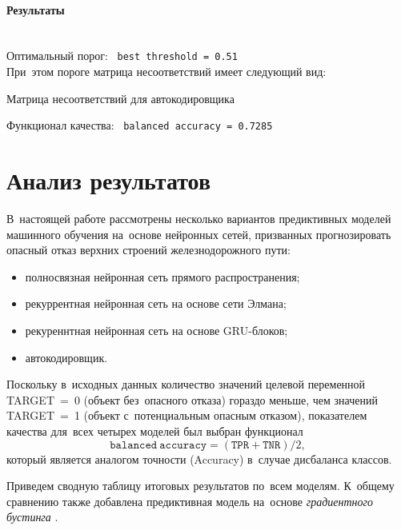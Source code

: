 \vspace{-2.5ex}
\paragraph{Результаты}~\\
Оптимальный порог: \ \texttt{best\ threshold = 0.51}\\
При~этом пороге матрица несоответствий имеет следующий вид:

\begin{table}[!h]
	\centering
	\caption{Матрица несоответствий для автокодировщика}\medskip
	
	\label{AE_conf_mtrx}
\end{table}

\noindent
Функционал качества: \ \texttt{balanced\ accuracy = 0.7285}

\clearpage
\section{Анализ результатов}\label{results}

В~настоящей работе рассмотрены несколько вариантов предиктивных моделей машинного обучения
на~основе нейронных сетей, призванных прогнозировать опасный отказ верхних строений железнодорожного пути:

\begin{itemize}[noitemsep, wide]
	\item полносвязная нейронная сеть прямого распространения;
	\item рекуррентная нейронная сеть на основе сети Элмана;
	\item рекуреннтная нейронная сеть на основе GRU-блоков;
	\item автокодировщик.
\end{itemize}

Поскольку в~исходных данных количество значений целевой переменной TARGET~=~0 (объект без~опасного отказа) 
гораздо меньше, чем значений TARGET~=~1 (объект с~потенциальным опасным отказом),
показателем качества для~всех четырех моделей был выбран функционал 
\begin{equation*}
	\mathtt{balanced\ accuracy = \left(TPR + TNR\right)} / 2,
\end{equation*}
который является аналогом точности (Accuracy) в~случае дисбаланса классов.

Приведем сводную таблицу итоговых результатов по~всем моделям. К~общему сравнению также добавлена
предиктивная модель на~основе \textit{градиентного бустинга} \cite{grad_boosting}.

